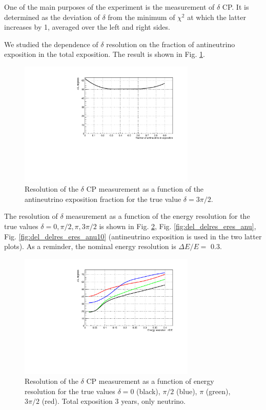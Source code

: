 \documentclass[prd,showpacs,groupedaddress,superscriptaddress,amsmath,amssymb]{revtex4-2} %
\begin{document}
 One of the main purposes of the experiment is the measurement of $\delta$ CP. It is determined as the deviation of $\delta$ from the minimum
of $\chi^2$ at which the latter increases by 1, averaged over the left and right sides.

 We studied the dependence of $\delta$ resolution on the fraction of antineutrino exposition in the total exposition. The result
is shown in Fig. \ref{fig:del_delres_anufrac}.

\begin{figure}[h]
\begin{center}
\includegraphics[width=0.75\textwidth]{del_delres_anufrac.pdf}
\caption {Resolution of the $\delta$ CP measurement as a function of the antineutrino exposition fraction for the true value $\delta = 3\pi/2$.
\label{fig:del_delres_anufrac}}
\end{center}
\end{figure}

 The resolution of $\delta$ measurement as a function of the energy resolution for the true values $\delta = 0, \pi/2, \pi, 3\pi/2$ is shown
in Fig. \ref{fig:del_delres_eres}, Fig. \ref{fig:del_delres_eres_anu}, Fig. \ref{fig:del_delres_eres_anu10} (antineutrino exposition is used
in the two latter plots). As a reminder, the nominal energy resolution is $\Delta E / E =$ 0.3.

\begin{figure}[h]
\begin{center}
\includegraphics[width=0.75\textwidth]{del_delres_eres.pdf}
\caption {Resolution of the $\delta$ CP measurement as a function of energy resolution for the true values $\delta = 0$ (black), $\pi/2$ (blue),
$\pi$ (green), $3\pi/2$ (red). Total exposition 3 years, only neutrino.
\label{fig:del_delres_eres}}
\end{center}
\end{figure}
\end{document}

